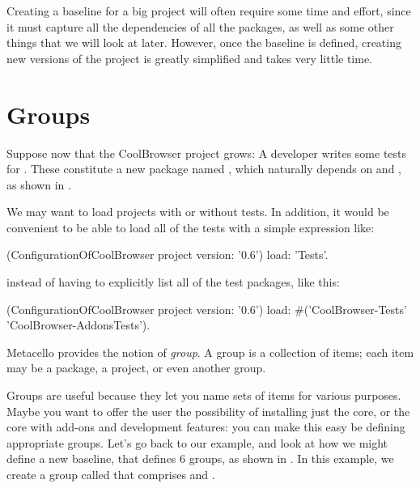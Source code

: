 \documentclass[a4paper,10pt,twoside]{book}
\begin{document}
Creating a baseline for a big project will often require some time and effort, since it must capture all the dependencies of all the packages, as well as some other things that we will look at later.
However, once the baseline is defined, creating new versions of the project is greatly simplified and takes very little time. 

\section{Groups}
Suppose now that the CoolBrowser project grows: A developer writes some tests for .  These constitute a new package named , which naturally depends on  and , as shown in .

We may want to load projects with or without tests. In addition, it would be convenient to be able to load all of the tests with a simple expression like:

\begin{code}{}
(ConfigurationOfCoolBrowser project version: '0.6') load: 'Tests'.
\end{code}

instead of having to explicitly list all of the test packages, like this:
 
\begin{code}{} 
(ConfigurationOfCoolBrowser project version: '0.6') 
       load: #('CoolBrowser-Tests' 'CoolBrowser-AddonsTests').
\end{code}
 
Metacello provides the notion of \emph{group}. A group is a collection of items; each item may be a package, a project, or even another group.  
 
Groups are useful because they let you name sets of items for various purposes. Maybe you want to offer the  user the possibility of installing just the core, or the core with add-ons and development features: you can make this easy be defining appropriate groups.  Let's go back to our example, and look at how we might define a new baseline,  that defines 6 groups, as shown in . In this example, we create a group called  that comprises  and . 
\end{document}
